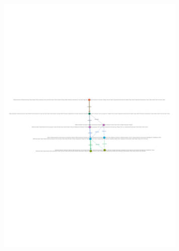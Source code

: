 \begin{figure}[H]
	\centering
	\includegraphics[width=0.8\textwidth]{images/LTag.pdf}
	\caption{}
	\label{fig:LTag}
\end{figure}

% 